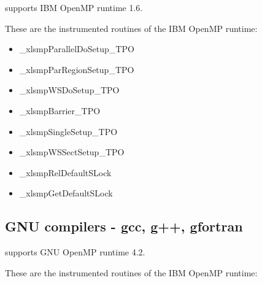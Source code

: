 \TRACE supports IBM OpenMP runtime 1.6.

These are the instrumented routines of the IBM OpenMP runtime:

\begin{itemize}
\item \_xlsmpParallelDoSetup\_TPO
\item \_xlsmpParRegionSetup\_TPO
\item \_xlsmpWSDoSetup\_TPO
\item \_xlsmpBarrier\_TPO
\item \_xlsmpSingleSetup\_TPO
\item \_xlsmpWSSectSetup\_TPO
\item \_xlsmpRelDefaultSLock\footnotemark[4]
\item \_xlsmpGetDefaultSLock\footnotemark[4]
\end{itemize}

\subsection{GNU compilers - gcc, g++, gfortran}

\TRACE supports GNU OpenMP runtime 4.2.

These are the instrumented routines of the IBM OpenMP runtime:

